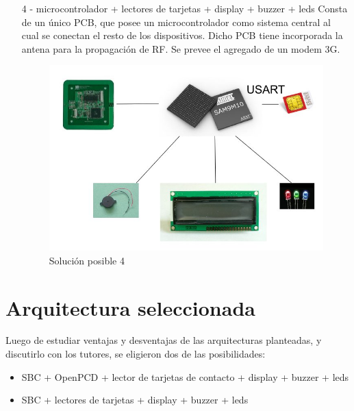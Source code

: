 \begin{itemize}
\item[4 -] microcontrolador + lectores de tarjetas + display + buzzer + leds
Consta de un único PCB, que posee un microcontrolador como sistema central al cual se
conectan el resto de los dispositivos. Dicho PCB tiene incorporada la antena para la
propagación de RF. Se prevee el agregado de un modem 3G.

\begin{figure}[H]
\centering
  \begin{center}
  \includegraphics[scale=.25]{Imagenes/4.jpg} 
  \end{center}
  \caption{Solución posible 4}\label{Fig:HW} 
\end{figure}

\end{itemize}

\newpage
\section{Arquitectura seleccionada}
Luego de estudiar ventajas y desventajas de las arquitecturas planteadas, y discutirlo con los tutores, se eligieron dos de las posibilidades:

\begin{itemize}
\item SBC + OpenPCD + lector de tarjetas de contacto + display + buzzer + leds
\item SBC + lectores de tarjetas + display + buzzer + leds
\end{itemize}

